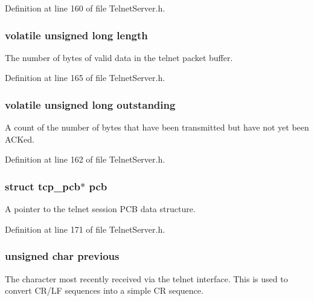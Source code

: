 Definition at line 160 of file Telnet\-Server.\-h.

\hypertarget{struct_telnet_server__t_a41a73345f82ef7f47757b13967fcc815}{
\subsubsection[{length}]{\setlength{\rightskip}{0pt plus 5cm}volatile unsigned long length}}\label{struct_telnet_server__t_a41a73345f82ef7f47757b13967fcc815}
The number of bytes of valid data in the telnet packet buffer. 

Definition at line 165 of file Telnet\-Server.\-h.

\hypertarget{struct_telnet_server__t_ad311f0113656983251afddd4b62e758e}{
\subsubsection[{outstanding}]{\setlength{\rightskip}{0pt plus 5cm}volatile unsigned long outstanding}}\label{struct_telnet_server__t_ad311f0113656983251afddd4b62e758e}
A count of the number of bytes that have been transmitted but have not yet been A\-C\-Ked. 

Definition at line 162 of file Telnet\-Server.\-h.

\hypertarget{struct_telnet_server__t_a7d8c5f5eed3154f7848c3a2ac9a9863a}{
\subsubsection[{pcb}]{\setlength{\rightskip}{0pt plus 5cm}struct tcp\-\_\-pcb$\ast$ pcb}}\label{struct_telnet_server__t_a7d8c5f5eed3154f7848c3a2ac9a9863a}
A pointer to the telnet session P\-C\-B data structure. 

Definition at line 171 of file Telnet\-Server.\-h.

\hypertarget{struct_telnet_server__t_a8616416f9e7e002fe8f0a98f0ed71fd5}{
\subsubsection[{previous}]{\setlength{\rightskip}{0pt plus 5cm}unsigned char previous}}\label{struct_telnet_server__t_a8616416f9e7e002fe8f0a98f0ed71fd5}
The character most recently received via the telnet interface. This is used to convert C\-R/\-L\-F sequences into a simple C\-R sequence. 

